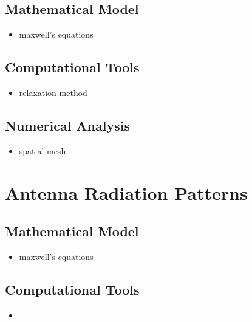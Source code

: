 \documentclass{report}
\begin{document}
        \subsection{Mathematical Model}

            \begin{itemize}
                \item maxwell's equations
            \end{itemize}

        \subsection{Computational Tools}

            \begin{itemize}
                \item relaxation method
            \end{itemize}

        \subsection{Numerical Analysis}

            \begin{itemize}
                \item spatial mesh
            \end{itemize}

    \section{Antenna Radiation Patterns}

        \subsection{Mathematical Model}

            \begin{itemize}
                \item maxwell's equations
            \end{itemize}

        \subsection{Computational Tools}

            \begin{itemize}
                \item 
            \end{itemize}
\end{document}
